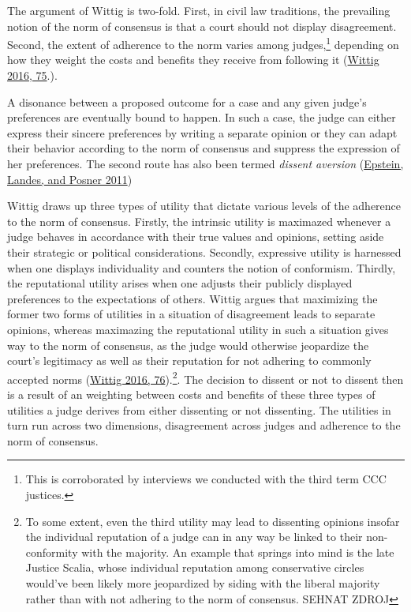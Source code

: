 \documentclass[
  11pt,
]{article}
\begin{document}
The argument of Wittig is two-fold. First, in civil law traditions, the
prevailing notion of the norm of consensus is that a court should not
display disagreement. Second, the extent of adherence to the norm varies
among judges,\footnote{This is corroborated by interviews we conducted
  with the third term CCC justices.} depending on how they weight the
costs and benefits they receive from following it
(\protect\hyperlink{ref-wittigOccurrenceSeparateOpinions2016}{Wittig
2016, 75}.).

A disonance between a proposed outcome for a case and any given judge's
preferences are eventually bound to happen. In such a case, the judge
can either express their sincere preferences by writing a separate
opinion or they can adapt their behavior according to the norm of
consensus and suppress the expression of her preferences. The second
route has also been termed \emph{dissent aversion}
(\protect\hyperlink{ref-epsteinWhyWhenJudges2011}{Epstein, Landes, and
Posner 2011})

Wittig draws up three types of utility that dictate various levels of
the adherence to the norm of consensus. Firstly, the intrinsic utility
is maximazed whenever a judge behaves in accordance with their true
values and opinions, setting aside their strategic or political
considerations. Secondly, expressive utility is harnessed when one
displays individuality and counters the notion of conformism. Thirdly,
the reputational utility arises when one adjusts their publicly
displayed preferences to the expectations of others. Wittig argues that
maximizing the former two forms of utilities in a situation of
disagreement leads to separate opinions, whereas maximazing the
reputational utility in such a situation gives way to the norm of
consensus, as the judge would otherwise jeopardize the court's
legitimacy as well as their reputation for not adhering to commonly
accepted norms
(\protect\hyperlink{ref-wittigOccurrenceSeparateOpinions2016}{Wittig
2016, 76}).\footnote{To some extent, even the third utility may lead to
  dissenting opinions insofar the individual reputation of a judge can
  in any way be linked to their non-conformity with the majority. An
  example that springs into mind is the late Justice Scalia, whose
  individual reputation among conservative circles would've been likely
  more jeopardized by siding with the liberal majority rather than with
  not adhering to the norm of consensus. SEHNAT ZDROJ}. The decision to
dissent or not to dissent then is a result of an weighting between costs
and benefits of these three types of utilities a judge derives from
either dissenting or not dissenting. The utilities in turn run across
two dimensions, disagreement across judges and adherence to the norm of
consensus.
\end{document}
